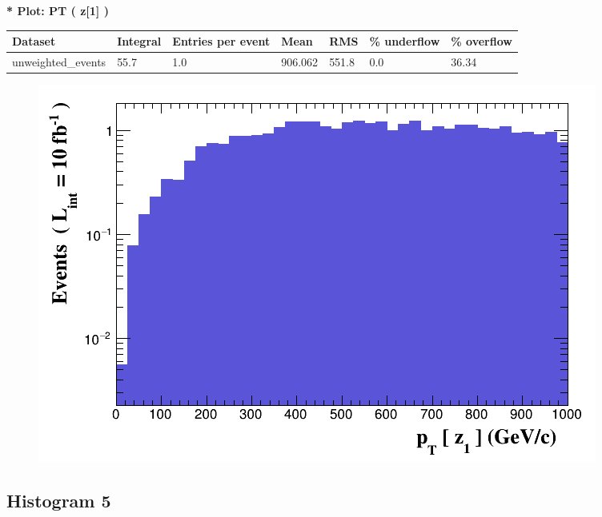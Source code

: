 \documentclass[a4paper, 10pt]{article}
\begin{document}
\textbf{* Plot: PT ( z[1] ) }\\
   \begin{table}[H]
  \begin{center}
    \begin{tabular}{|m{23.0mm}|m{23.0mm}|m{18.0mm}|m{19.0mm}|m{19.0mm}|m{19.0mm}|m{19.0mm}|}
      \hline
      {\cellcolor{yellow}         Dataset}& {\cellcolor{yellow}         Integral}& {\cellcolor{yellow}         Entries per event}& {\cellcolor{yellow}         Mean}& {\cellcolor{yellow}         RMS}& {\cellcolor{yellow}         \% underflow}& {\cellcolor{yellow}         \% overflow}\\
      \hline
      {\cellcolor{white}         unweighted\_events}& {\cellcolor{white}         55.7}& {\cellcolor{white}         1.0}& {\cellcolor{white}         906.062}& {\cellcolor{white}         551.8}& {\cellcolor{red}         0.0}& {\cellcolor{red}         36.34}\\
\hline
    \end{tabular}
  \end{center}
\end{table}

\begin{figure}[H]
  \begin{center}
    \includegraphics[scale=0.45]{selection_3.png}\\
\caption{   }
  \end{center}
\end{figure}
      \newpage
\subsection{ Histogram 5}
\end{document}
